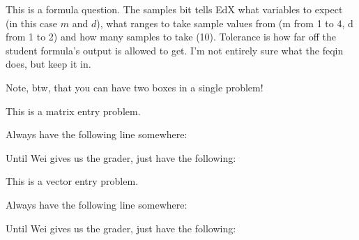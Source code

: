 This is a formula question.  The samples bit tells EdX what variables to expect (in this case $m$ and $d$),
what ranges to take sample values from (m from 1 to 4, d from 1 to 2) and how many samples to take (10).
Tolerance is how far off the student formula's output is allowed to get.  I'm not entirely sure
what the feqin does, but keep it in.  


Note, btw, that you can have two boxes in a single problem!


\edXsolution{ 

}

\endedxproblem



This is a matrix entry problem.


Always have the following line somewhere:




Until Wei gives us the grader, just have the following:





\edXsolution{ 
}


\endedxproblem



This is a vector entry problem.


Always have the following line somewhere:




Until Wei gives us the grader, just have the following:





\edXsolution{ 
}


\endedxproblem